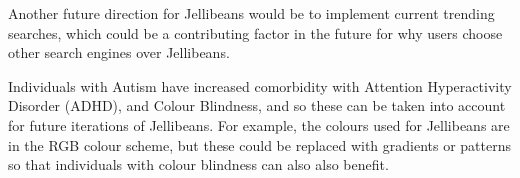 \documentclass[a4paper, 11pt]{article}
\begin{document}
\vspace{5mm}
Another future direction for Jellibeans would be to implement current trending searches, which could be a contributing factor in the future for why users choose other search engines over Jellibeans. 

\vspace{5mm}
Individuals with Autism have increased comorbidity with Attention Hyperactivity Disorder (ADHD), and Colour Blindness, and so these can be taken into account for future iterations of Jellibeans. For example, the colours used for Jellibeans are in the RGB colour scheme, but these could be replaced with gradients or patterns so that individuals with colour blindness can also also benefit.





\clearpage
\end{document}
